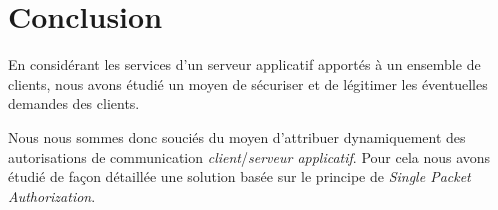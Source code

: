 \chapter*{Conclusion}

En considérant les services d'un serveur applicatif apportés à un ensemble de clients, nous avons étudié un moyen de sécuriser et de légitimer les éventuelles demandes des clients.

Nous nous sommes donc souciés du moyen d'attribuer dynamiquement des autorisations de communication \emph{client}/\emph{serveur applicatif}. Pour cela nous avons étudié de façon détaillée une solution basée sur le principe de \emph{Single Packet Authorization}.







